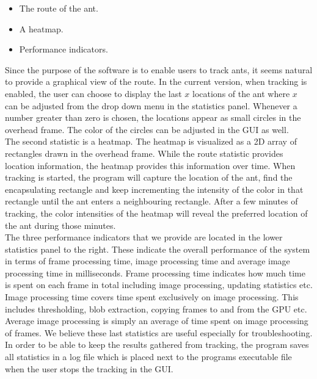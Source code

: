 \begin{itemize}
  \item{The route of the ant.}
  \item{A heatmap.}
  \item{Performance indicators.}
\end{itemize}

Since the purpose of the software is to enable users to track ants, it seems natural to provide a graphical view of the route. In the current version, when tracking is enabled, the user can choose to display the last $x$ locations of the ant where $x$ can be adjusted from the drop down menu in the statistics panel. Whenever a number greater than zero is chosen, the locations appear as small circles in the overhead frame.
The color of the circles can be adjusted in the GUI as well. \\	

The second statistic is a heatmap. The heatmap is visualized as a 2D array of rectangles drawn in the overhead frame. While the route statistic provides location information, the heatmap provides this information over time. When tracking is started, the program will capture the location of the ant, find the encapsulating rectangle and keep incrementing the intensity of the color in that rectangle until the ant enters a neighbouring rectangle. After a few minutes of tracking, the color intensities of the heatmap will reveal the preferred location of the ant during those minutes. \\

The three performance indicators that we provide are located in the lower statistics panel to the right. These indicate the overall performance of the system in terms of frame processing time, image processing time and average image processing time in milliseconds. Frame processing time indicates how much time is spent on each frame in total including image processing, updating statistics etc. Image processing time covers time spent exclusively on image processing. This includes thresholding, blob extraction, copying frames to and from the GPU etc. Average image processing is simply an average of time spent on image processing of frames. We believe these last statistics are useful especially for troubleshooting. \\

In order to be able to keep the results gathered from tracking, the program saves all statistics in a log file which is placed next to the programs executable file when the user stops the tracking in the GUI.

